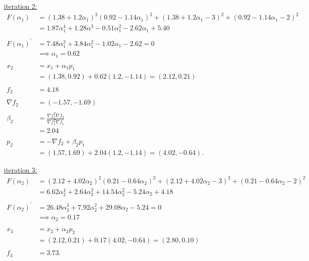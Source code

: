 \documentclass{article}
\begin{document}
\noindent
\underline{iteration 2:}
\begin{align*}
  F(\alpha_1) 
  &= (1.38+ 1.2\alpha_1)^2 (0.92 - 1.14 \alpha_1)^2 + (1.38+ 1.2\alpha_1 - 3)^2 + (0.92 - 1.14 \alpha_1 - 2)^2 &&\\
  &= 1.87 \alpha_1^4 + 1.28 \alpha^3 - 0.51 \alpha_1^2 - 2.62 \alpha_1 + 5.40 &&\\
  &&\\
  F(\alpha_1)^\prime &= 7.48 \alpha_1^3 +3.84 \alpha_1^2 - 1.02 \alpha_1 - 2.62 = 0 &&\\
  &\implies \alpha_1 = 0.62 &&\\
  &&\\
  x_2 &= x_1 + \alpha_1 p_1 &&\\
  &= (1.38, 0.92) + 0.62 (1.2, -1.14) = (2.12, 0.21) &&\\
  &&\\
  f_2 &= 4.18 &&\\
  &&\\
  \nabla f_2 &=  (-1.57, -1.69) &&\\
  &&\\
  \beta_{2} &= \frac{\nabla f_2^T \nabla f_2}{\nabla f_1^T \nabla f_1} &&\\
  &= 2.04 &&\\
  &&\\
  p_2 &= -\nabla f_2 + \beta_2 p_1 &&\\
  &= (1.57, 1.69) + 2.04 (1.2, -1.14) = (4.02, -0.64).
\end{align*}
\newline

\noindent
\underline{iteration 3:}
\begin{align*}
  F(\alpha_2) 
  &= (2.12 + 4.02 \alpha_2)^2 (0.21 - 0.64 \alpha_2)^2
  + (2.12 + 4.02 \alpha_2 - 3)^2
  + (0.21 - 0.64 \alpha_2 - 2)^2 &&\\
  &= 6.62 \alpha_2^4 + 2.64 \alpha_2^3 + 14.54 \alpha_2^2 - 5.24 \alpha_2 + 4.18 &&\\
  &&\\
  F(\alpha_2)^\prime &= 26.48 \alpha_2^3 + 7.92 \alpha_2^2 + 29.08 \alpha_2 - 5.24 = 0 &&\\
  &\implies \alpha_2 = 0.17 &&\\
  &&\\
  x_3 &= x_2 + \alpha_2 p_2 &&\\
  &= (2.12, 0.21) + 0.17 (4.02, -0.64) = (2.80, 0.10) &&\\
  &&\\
  f_3 &= 3.73.
\end{align*}
\end{document}
